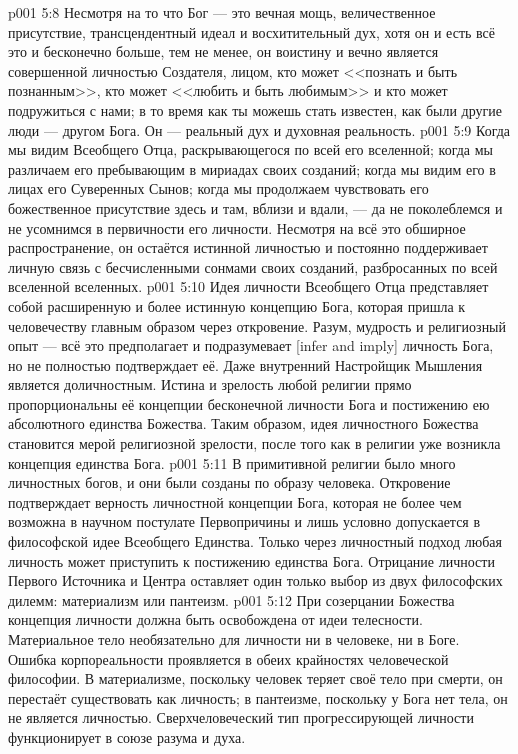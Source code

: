 \vs p001 5:8 \pc Несмотря на то что Бог --- это вечная мощь, величественное присутствие, трансцендентный идеал и восхитительный дух, хотя он и есть всё это и бесконечно больше, тем не менее, он воистину и вечно является совершенной личностью Создателя, лицом, кто может <<познать и быть познанным>>, кто может <<любить и быть любимым>> и кто может подружиться с нами; в то время как ты можешь стать известен, как были другие люди --- другом Бога. Он --- реальный дух и духовная реальность.
\vs p001 5:9 Когда мы видим Всеобщего Отца, раскрывающегося по всей его вселенной; когда мы различаем его пребывающим в мириадах своих созданий; когда мы видим его в лицах его Суверенных Сынов; когда мы продолжаем чувствовать его божественное присутствие здесь и там, вблизи и вдали, --- да не поколеблемся и не усомнимся в первичности его личности. Несмотря на всё это обширное распространение, он остаётся истинной личностью и постоянно поддерживает личную связь с бесчисленными сонмами своих созданий, разбросанных по всей вселенной вселенных.
\vs p001 5:10 \pc Идея личности Всеобщего Отца представляет собой расширенную и более истинную концепцию Бога, которая пришла к человечеству главным образом через откровение. Разум, мудрость и религиозный опыт --- всё это предполагает и подразумевает [infer and imply] личность Бога, но не полностью подтверждает её. Даже внутренний Настройщик Мышления является доличностным. Истина и зрелость любой религии прямо пропорциональны её концепции бесконечной личности Бога и постижению ею абсолютного единства Божества. Таким образом, идея личностного Божества становится мерой религиозной зрелости, после того как в религии уже возникла концепция единства Бога.
\vs p001 5:11 В примитивной религии было много личностных богов, и они были созданы по образу человека. Откровение подтверждает верность личностной концепции Бога, которая не более чем возможна в научном постулате Первопричины и лишь условно допускается в философской идее Всеобщего Единства. Только через личностный подход любая личность может приступить к постижению единства Бога. Отрицание личности Первого Источника и Центра оставляет один только выбор из двух философских дилемм: материализм или пантеизм.
\vs p001 5:12 При созерцании Божества концепция личности должна быть освобождена от идеи телесности. Материальное тело необязательно для личности ни в человеке, ни в Боге. Ошибка корпореальности проявляется в обеих крайностях человеческой философии. В материализме, поскольку человек теряет своё тело при смерти, он перестаёт существовать как личность; в пантеизме, поскольку у Бога нет тела, он не является личностью. Сверхчеловеческий тип прогрессирующей личности функционирует в союзе разума и духа.
